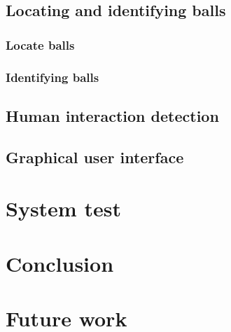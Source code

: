 	\section{Locating and identifying balls}
		\label{sec:balls-intro}	
			
		
			\subsection{Locate balls}
				\label{sec:balls-locate}
				
		
			\subsection{Identifying balls}
				\label{sec:balls-id}
				
				
	\section{Human interaction detection}
		\label{sec:shotdetection}
		
				
	\section{Graphical user interface}
		\label{sec:gui}
		

\chapter{System test}
	\label{sec:system-test}
	
	
\chapter{Conclusion}
	\label{sec:conclusion}
	
	
\chapter{Future work}
	\label{sec:futurework}
	




